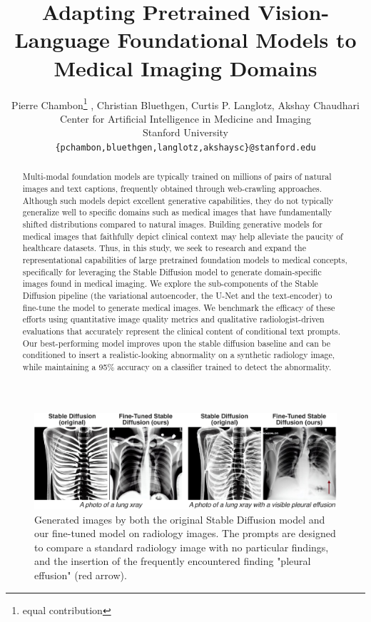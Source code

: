 \documentclass{article}
\title{Adapting Pretrained Vision-Language Foundational Models to Medical Imaging Domains}
\author{
    Pierre Chambon\thanks{equal contribution} , Christian Bluethgen\footnotemark[1] , Curtis P. Langlotz, Akshay Chaudhari\\
    Center for Artificial Intelligence in Medicine and Imaging \\
    Stanford University\\
    \texttt{\{pchambon,bluethgen,langlotz,akshaysc\}@stanford.edu}
}
\begin{document}
\maketitle


\begin{abstract}
Multi-modal foundation models are typically trained on millions of pairs of natural images and text captions, frequently obtained through web-crawling approaches. Although such models depict excellent generative capabilities, they do not typically generalize well to specific domains such as medical images that have fundamentally shifted distributions compared to natural images. Building generative models for medical images that faithfully depict clinical context may help alleviate the paucity of healthcare datasets. Thus, in this study, we seek to research and expand the representational capabilities of large pretrained foundation models to medical concepts, specifically for leveraging the Stable Diffusion model to generate domain-specific images found in medical imaging. We explore the sub-components of the Stable Diffusion pipeline (the variational autoencoder, the U-Net and the text-encoder) to fine-tune the model to generate medical images. We benchmark the efficacy of these efforts using quantitative image quality metrics and qualitative radiologist-driven evaluations that accurately represent the clinical content of conditional text prompts. Our best-performing model improves upon the stable diffusion baseline and can be conditioned to insert a realistic-looking abnormality on a synthetic radiology image, while maintaining a 95\% accuracy on a classifier trained to detect the abnormality.

\end{abstract}

\begin{figure}[hbt!]
  \centering
    \includegraphics[width=138mm]{fig_1.pdf}
  \caption{Generated images by both the original Stable Diffusion model and our fine-tuned model on radiology images. The prompts are designed to compare a standard radiology image with no particular findings, and the insertion of the frequently encountered finding "pleural effusion" (red arrow).}
  \label{figure-model-outputs}
\end{figure}
\end{document}
